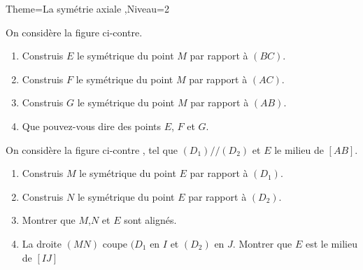 \documentclass[a4paper,12pt]{article}
\begin{document}
\begin{Maquette}[Fiche]{Theme=La symétrie axiale ,Niveau=2}

\begin{exercice}
\begin{minipage}{.7\linewidth}
On considère la figure ci-contre.
\begin{enumerate}
\item Construis $E$ le symétrique du point $M$ par rapport à $(BC)$.
\item Construis $F$ le symétrique du point $M$ par rapport à $(AC)$.
\item Construis $G$ le symétrique du point $M$ par rapport à $(AB)$.
\item Que pouvez-vous dire des points $E$, $F$ et $G$.
\end{enumerate}
\end{minipage}%
\begin{minipage}{.3\linewidth}
\end{minipage}
\end{exercice}

\begin{exercice}
On considère la figure ci-contre , tel que $(D_{1})//(D_{2})$ et $E$ le milieu de $[AB]$.
\begin{enumerate}
\item Construis $M$ le symétrique du point $E$ par rapport à $(D_{1})$.
\item Construis $N$ le symétrique du point $E$ par rapport à $(D_{2})$.
\item Montrer que $M$,$N$ et $E$ sont alignés.
\item La droite $(MN)$ coupe $(D_{1}$ en $I$ et $(D_{2})$ en $J$. Montrer que $E$ est le milieu de $[IJ]$
\end{enumerate}

\end{exercice}


\end{Maquette}
\end{document}
